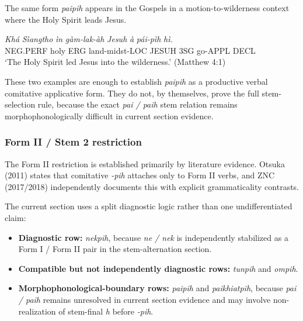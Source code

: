 \documentclass[
  11pt,
  a4paper,
]{article}
\providecommand{\tightlist}{%
  \setlength{\itemsep}{0pt}\setlength{\parskip}{0pt}}
\newcommand{\tdim}[1]{\textit{#1}}
\newcommand{\tdimword}[1]{\textit{#1}}
\renewcommand{\textsc}[1]{{\footnotesize\MakeUppercase{#1}}}
\newcommand{\glossquote}[1]{`#1'}
\begin{document}
The same form \tdim{paipih} appears in the Gospels in a
motion-to-wilderness context where the Holy Spirit leads Jesus.

\begin{exe}
\ex \label{ex:pih-core-paipih-matt4}
\gll \tdimword{Khá} \tdimword{Sìangtho} \tdimword{ìn} \tdimword{gàm-lak-àh} \tdimword{Jesuh} \tdimword{à} \tdimword{pái-pìh} \tdimword{hì.} \\
     \textsc{neg}.\textsc{perf} holy \textsc{erg} land-midst-\textsc{loc} \textsc{jesuh} \textsc{3sg} go-\textsc{appl} \textsc{decl} \\
\glt \glossquote{The Holy Spirit led Jesus into the wilderness.} (Matthew 4:1)
\end{exe}

These two examples are enough to establish \tdim{paipih} as a productive
verbal comitative applicative form. They do not, by themselves, prove
the full stem-selection rule, because the exact \tdim{pai / paih} stem
relation remains morphophonologically difficult in current section
evidence.

\subsubsection{Form II / Stem 2
restriction}\label{form-ii-stem-2-restriction}

The Form II restriction is established primarily by literature evidence.
Otsuka (2011) states that comitative \tdim{-pih} attaches only to Form
II verbs, and ZNC (2017/2018) independently documents this with explicit
grammaticality contrasts.

The current section uses a split diagnostic logic rather than one
undifferentiated claim:

\begin{itemize}
\tightlist
\item
  \textbf{Diagnostic row:} \tdim{nekpih}, because \tdim{ne / nek} is
  independently stabilized as a Form I / Form II pair in the
  stem-alternation section.
\item
  \textbf{Compatible but not independently diagnostic rows:}
  \tdim{tunpih} and \tdim{ompih}.
\item
  \textbf{Morphophonological-boundary rows:} \tdim{paipih} and
  \tdim{paikhiatpih}, because \tdim{pai / paih} remains unresolved in
  current section evidence and may involve non-realization of stem-final
  \tdim{h} before \tdim{-pih}.
\end{itemize}
\end{document}
